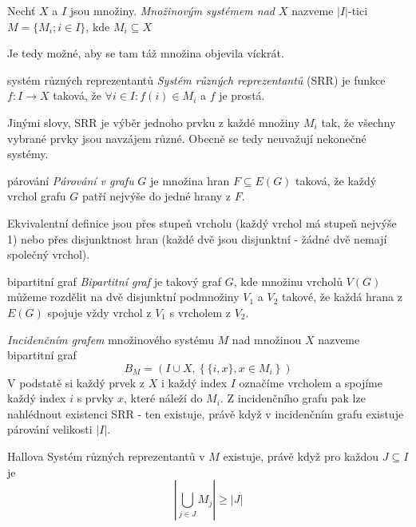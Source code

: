 \begin{definice}
Nechť $X$ a $I$ jsou množiny. \emph{Množinovým systémem nad $X$} nazveme $|I|$-tici $M=\{M_i; i \in I\}$, kde $M_i \subseteq X$

Je tedy možné, aby se tam táž množina objevila víckrát.
\end{definice}

\begin{definiceN}{systém různých reprezentantů}
\emph{Systém různých reprezentantů} (SRR) je funkce $f: I \rightarrow X$ taková, že $\forall i \in I: f(i) \in M_i$ a $f$ je prostá.

Jinými slovy, SRR je výběr jednoho prvku z každé množiny $M_i$ tak, že všechny vybrané prvky jsou navzájem různé. Obecně se tedy neuvažují nekonečné systémy.
\end{definiceN}

\begin{definiceN}{párování}
\emph{Párování v grafu} $G$ je množina hran $F \subseteq E(G)$ taková, že každý vrchol grafu $G$ patří nejvýše do jedné hrany z $F$.

Ekvivalentní definice jsou přes stupeň vrcholu (každý vrchol má stupeň nejvýše 1) nebo přes disjunktnost hran (každé dvě jsou disjunktní - žádné dvě nemají společný vrchol).
\end{definiceN}

\begin{definiceN}{bipartitní graf}
\emph{Bipartitní graf} je takový graf $G$, kde množinu vrcholů $V(G)$ můžeme rozdělit na dvě disjunktní podmnožiny $V_1$ a $V_2$ takové, že každá hrana z $E(G)$ spojuje vždy vrchol z $V_1$ s vrcholem z $V_2$.
\end{definiceN}

\begin{definice}
\emph{Incidenčním grafem} množinového systému $M$ nad množinou $X$ nazveme bipartitní graf
$$
B_M = \left( I \cup X, \left\{ \{i,x\}, x \in M_i \right\} \right)
$$
\noindent
V podstatě si každý prvek z $X$ i každý index $I$ označíme vrcholem a spojíme každý index $i$ s prvky $x$, které náleží do $M_i$. Z incidenčního grafu pak lze nahlédnout existenci SRR - ten existuje, právě když v incidenčním grafu existuje párování velikosti $|I|$.
\end{definice}

\begin{vetaN}{Hallova}
Systém různých reprezentantů v $M$ existuje, právě když pro každou $J \subseteq I$ je $$\left| \bigcup_{j \in J} M_j\right| \ge |J|$$
\end{vetaN}

